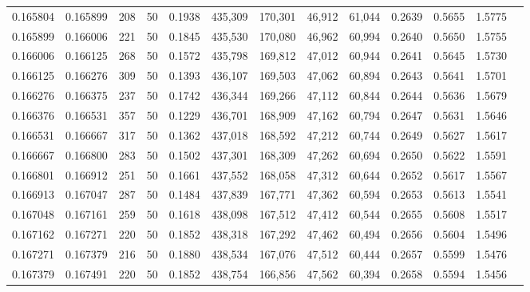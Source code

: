 \begin{tabular}{rrrrrrrrrrrrr}
0.165804 & 0.165899 &   208 &  50 &                                     0.1938 & 435,309 & 170,301 &  46,912 &  61,044 & 0.2639 & 0.5655 & 1.5775 \\
0.165899 & 0.166006 &   221 &  50 &                                     0.1845 & 435,530 & 170,080 &  46,962 &  60,994 & 0.2640 & 0.5650 & 1.5755 \\
0.166006 & 0.166125 &   268 &  50 &                                     0.1572 & 435,798 & 169,812 &  47,012 &  60,944 & 0.2641 & 0.5645 & 1.5730 \\
0.166125 & 0.166276 &   309 &  50 &                                     0.1393 & 436,107 & 169,503 &  47,062 &  60,894 & 0.2643 & 0.5641 & 1.5701 \\
0.166276 & 0.166375 &   237 &  50 &                                     0.1742 & 436,344 & 169,266 &  47,112 &  60,844 & 0.2644 & 0.5636 & 1.5679 \\
0.166376 & 0.166531 &   357 &  50 &                                     0.1229 & 436,701 & 168,909 &  47,162 &  60,794 & 0.2647 & 0.5631 & 1.5646 \\
0.166531 & 0.166667 &   317 &  50 &                                     0.1362 & 437,018 & 168,592 &  47,212 &  60,744 & 0.2649 & 0.5627 & 1.5617 \\
0.166667 & 0.166800 &   283 &  50 &                                     0.1502 & 437,301 & 168,309 &  47,262 &  60,694 & 0.2650 & 0.5622 & 1.5591 \\
0.166801 & 0.166912 &   251 &  50 &                                     0.1661 & 437,552 & 168,058 &  47,312 &  60,644 & 0.2652 & 0.5617 & 1.5567 \\
0.166913 & 0.167047 &   287 &  50 &                                     0.1484 & 437,839 & 167,771 &  47,362 &  60,594 & 0.2653 & 0.5613 & 1.5541 \\
0.167048 & 0.167161 &   259 &  50 &                                     0.1618 & 438,098 & 167,512 &  47,412 &  60,544 & 0.2655 & 0.5608 & 1.5517 \\
0.167162 & 0.167271 &   220 &  50 &                                     0.1852 & 438,318 & 167,292 &  47,462 &  60,494 & 0.2656 & 0.5604 & 1.5496 \\
0.167271 & 0.167379 &   216 &  50 &                                     0.1880 & 438,534 & 167,076 &  47,512 &  60,444 & 0.2657 & 0.5599 & 1.5476 \\
0.167379 & 0.167491 &   220 &  50 &                                     0.1852 & 438,754 & 166,856 &  47,562 &  60,394 & 0.2658 & 0.5594 & 1.5456 \\

\end{tabular}
